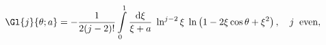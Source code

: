 \begin{equation}
\Gl{j}{\theta; a} =
-\frac{1}{2(j-2)!}\int\limits_0^1
\frac{{\rm d}\xi}{\xi+a}\; \ln^{j-2}\xi\; 
\ln\left(1-2\xi\cos\theta+\xi^2\right), \quad
j\;\;{\rm even},
\end{equation}

